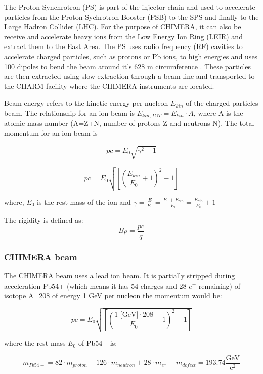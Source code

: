 
The Proton Synchrotron (PS) is part of the injector chain and used to accelerate particles from the Proton Sychrotron Booster (PSB) to the SPS and finally to the Large Hadron Collider (LHC). For the purpose of CHIMERA, it can also be receive and accelerate heavy ions from the Low Energy Ion Ring (LEIR) and extract them to the East Area. The PS uses radio frequency (RF) cavities to accelerate charged particles, such as protons or Pb ions, to high energies and uses 100 dipoles to bend the beam around it's 628 m circumference \cite{}. These particles are then extracted using slow extraction through a beam line and transported to the CHARM facility where the CHIMERA instruments are located.

Beam energy refers to the kinetic energy per nucleon $E_{kin}$ of the charged particles beam. The relationship for an ion beam is  $E_{kin, TOT}=E_{kin}\cdot A$, where A is the atomic mass number (A=Z+N, number of protons Z and neutrons N). The total momentum for an ion beam is

$$pc={E_{0}\sqrt{\gamma^{2}-1}}$$

$$pc = E_{0}\sqrt{\left [ \left( \frac{E_{kin}}{E_{0}}+1\right )^{2}-1\right ]}$$

where, $E_{0}$ is the rest mass of the ion and $\gamma=\frac{E}{E_{0}}=\frac{E_{0}+E_{cin}}{E_{0}} = \frac{E_{cin}}{E_{0}}+1$

The rigidity is defined as:
$$B\rho = \frac{pc}{q}$$

\subsubsection{CHIMERA beam}

The CHIMERA beam uses a lead ion beam. It is partially stripped during acceleration Pb54+ (which means it has 54 charges and 28 $e^{-}$ remaining) of isotope A=208 of energy 1 GeV per nucleon the momentum would be:

$$pc = E_{0}\sqrt{\left [ \left( \frac{1\text{ [GeV]}\cdot 208}{E_{0}}+1\right )^{2}-1\right ]}$$

where the rest mass $E_{0}$ of Pb54+ is:

$$m_{Pb54+}= 82\cdot m_{proton} + 126\cdot m_{neutron} + 28\cdot m_{e^{-}} - m_{defect} = 193.74 \frac{\text{GeV}}{\text{c}^{2}}$$

